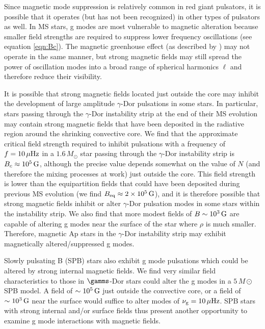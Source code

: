 Since magnetic mode suppression is relatively common in red giant pulsators, it is possible that it operates (but has not been recognized) in other types of pulsators as well. In MS stars, g modes are most vulnerable to magnetic alteration because smaller field strengths are required to suppress lower frequency oscillations (see equation \ref{eqn:Bc}). The magnetic greenhouse effect (as described by \cite{Fuller_2015}) may not operate in the same manner, but strong magnetic fields may still spread the power of oscillation modes into a broad range of spherical harmonics $\ell$ and therefore reduce their visibility. 

It is possible that strong magnetic fields located just outside the core may inhibit the development of large amplitude $\gamma$-Dor pulsations in some stars. In particular, stars passing through the $\gamma$-Dor instability strip at the end of their MS evolution may contain strong magnetic fields that have been deposited in the radiative region around the shrinking convective core. We find that the approximate critical field strength required to inhibit pulsations with a frequency of $f = 10 \, \mu {\rm Hz}$ in a $1.6 \, M_\odot$ star passing through the $\gamma$-Dor instability strip is $B_c \approx 10^5 \, {\rm G}$, although the precise value depends somewhat on the value of $N$ (and therefore the mixing processes at work) just outside the core. This field strength is lower than the equipartition fields that could have been deposited during previous MS evolution (we find $B_{\rm eq} \approx 2 \times 10^5 \, {\rm G}$), and it is therefore possible that strong magnetic fields inhibit or alter $\gamma$-Dor pulsation modes in some stars within the instability strip. We also find that more modest fields of $B \sim 10^{3} \, {\rm G}$ are capable of altering g modes near the surface of the star where $\rho$ is much smaller. Therefore, magnetic Ap stars in the $\gamma$-Dor instability strip may exhibit magnetically altered/suppressed g modes. 

Slowly pulsating B (SPB) stars also exhibit g mode pulsations which could be altered by strong internal magnetic fields. We find very similar field characteristics to those in $\gamms$-Dor stars could alter the g modes in a $5 \, M\odot$ SPB model. A field of $\sim 10^5 \, {\rm G}$ just outside the convective core, or a field of $\sim 10^{3} \, {\rm G}$ near the surface would suffice to alter modes of $\nu_{\rm g} = 10 \, \mu {\rm Hz}$. SPB stars with strong internal and/or surface fields thus present another opportunity to examine g mode interactions with magnetic fields.


  
  
  
  
  
  
  
  
  
  
  
  
  
  
  
  
  
  
  
  
  
  
  
  
  
  